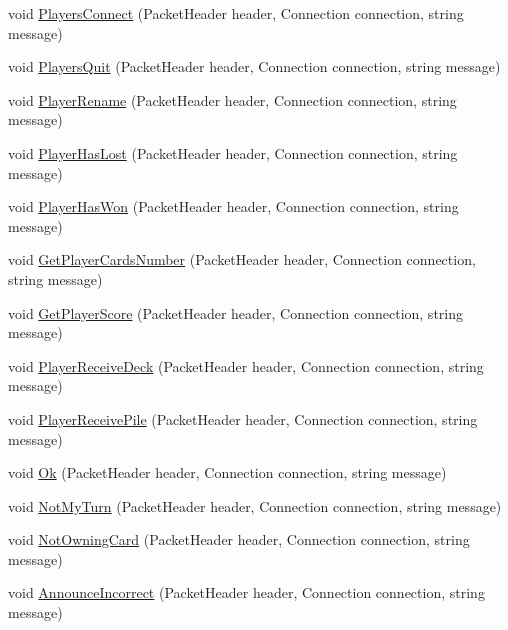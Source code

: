 \begin{DoxyCompactItemize}
\item 
void \hyperlink{class_client_1_1_event_manager_a8a67beed6389b1f6a1cab3742e7817ee}{Players\+Connect} (Packet\+Header header, Connection connection, string message)
\item 
void \hyperlink{class_client_1_1_event_manager_a56e8f36764340b1049c83f48e16d3e13}{Players\+Quit} (Packet\+Header header, Connection connection, string message)
\item 
void \hyperlink{class_client_1_1_event_manager_acfe5c23844435ad4b51104d31b75743f}{Player\+Rename} (Packet\+Header header, Connection connection, string message)
\item 
void \hyperlink{class_client_1_1_event_manager_a7a71a3bd8b1c0ecd10b8286c50f6d79d}{Player\+Has\+Lost} (Packet\+Header header, Connection connection, string message)
\item 
void \hyperlink{class_client_1_1_event_manager_a460ff979d6d31a452e4374c3144f0805}{Player\+Has\+Won} (Packet\+Header header, Connection connection, string message)
\item 
void \hyperlink{class_client_1_1_event_manager_ab2bcf174789c716591233351bb28d1e7}{Get\+Player\+Cards\+Number} (Packet\+Header header, Connection connection, string message)
\item 
void \hyperlink{class_client_1_1_event_manager_a0780cdbdad5e278920c1b01e81441e1a}{Get\+Player\+Score} (Packet\+Header header, Connection connection, string message)
\item 
void \hyperlink{class_client_1_1_event_manager_a78669a9c4545ffa2b35b8c2bfa750aa4}{Player\+Receive\+Deck} (Packet\+Header header, Connection connection, string message)
\item 
void \hyperlink{class_client_1_1_event_manager_a5876b23f48255516cf2f00052682e178}{Player\+Receive\+Pile} (Packet\+Header header, Connection connection, string message)
\item 
void \hyperlink{class_client_1_1_event_manager_a3e12d72c6c2c789dc45efd9ef0d7df68}{Ok} (Packet\+Header header, Connection connection, string message)
\item 
void \hyperlink{class_client_1_1_event_manager_a28db7dbdff678c58ae2365639eba8012}{Not\+My\+Turn} (Packet\+Header header, Connection connection, string message)
\item 
void \hyperlink{class_client_1_1_event_manager_ac3ea6f2f7242ce91e83244ed3af5cbfe}{Not\+Owning\+Card} (Packet\+Header header, Connection connection, string message)
\item 
void \hyperlink{class_client_1_1_event_manager_aa89e38b6c4951b76409d346715566695}{Announce\+Incorrect} (Packet\+Header header, Connection connection, string message)

\end{DoxyCompactItemize}

